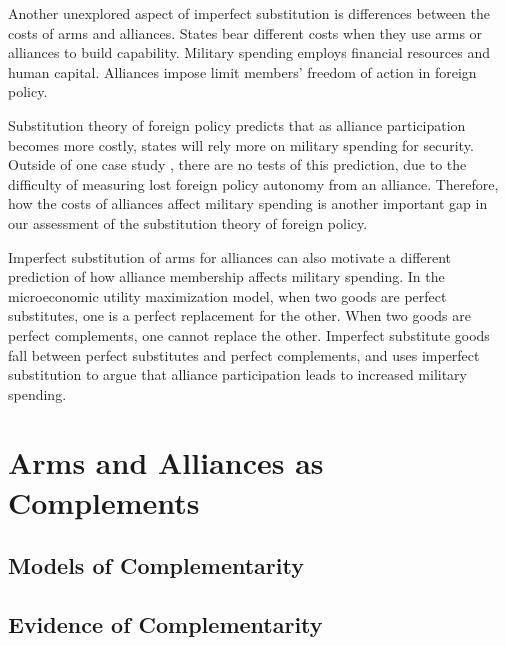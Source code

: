 \documentclass[12pt]{article}
\begin{document}
Another unexplored aspect of imperfect substitution is differences between the costs of arms and alliances. 
States bear different costs when they use arms or alliances to build capability.
Military spending employs financial resources and human capital. 
Alliances impose limit members' freedom of action in foreign policy. 


Substitution theory of foreign policy predicts that as alliance participation becomes more costly, states will rely more on military spending for security.
Outside of one case study \citep{Morrow1993}, there are no tests of this prediction, due to the difficulty of measuring lost foreign policy autonomy from an alliance. 
Therefore, how the costs of alliances affect military spending is another important gap in our assessment of the substitution theory of foreign policy. 


Imperfect substitution of arms for alliances can also motivate a different prediction of how alliance membership affects military spending.
In the microeconomic utility maximization model, when two goods are perfect substitutes, one is a perfect replacement for the other.
When two goods are perfect complements, one cannot replace the other. 
Imperfect substitute goods fall between perfect substitutes and perfect complements, and \citet{Diehl1994} uses imperfect substitution to argue that alliance participation leads to increased military spending.  




\section{Arms and Alliances as Complements}




\subsection{Models of Complementarity} 





\subsection{Evidence of Complementarity} 
\end{document}
